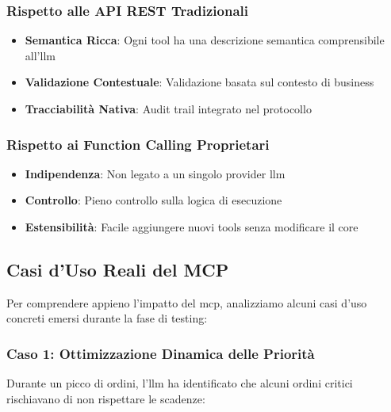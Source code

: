 \subsubsection{Rispetto alle API REST Tradizionali}
\begin{itemize}
    \item \textbf{Semantica Ricca}: Ogni tool ha una descrizione semantica comprensibile all'\gls{llm}
    \item \textbf{Validazione Contestuale}: Validazione basata sul contesto di business
    \item \textbf{Tracciabilità Nativa}: Audit trail integrato nel protocollo
\end{itemize}

\subsubsection{Rispetto ai Function Calling Proprietari}
\begin{itemize}
    \item \textbf{Indipendenza}: Non legato a un singolo provider \gls{llm}
    \item \textbf{Controllo}: Pieno controllo sulla logica di esecuzione
    \item \textbf{Estensibilità}: Facile aggiungere nuovi tools senza modificare il core
\end{itemize}

\subsection{Casi d'Uso Reali del MCP}
\label{subsec:mcp_use_cases}

Per comprendere appieno l'impatto del \gls{mcp}, analizziamo alcuni casi d'uso concreti emersi durante la fase di testing:

\subsubsection{Caso 1: Ottimizzazione Dinamica delle Priorità}
Durante un picco di ordini, l'\gls{llm} ha identificato che alcuni ordini critici rischiavano di non rispettare le scadenze:

